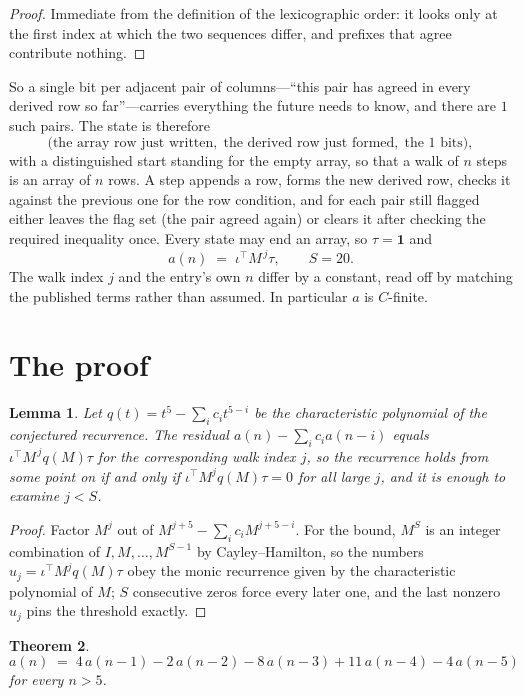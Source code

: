 \documentclass[11pt,a4paper]{article}
\theoremstyle{plain}
\newtheorem{theorem}{Theorem}
\newtheorem{lemma}[theorem]{Lemma}
\theoremstyle{definition}
\begin{document}
\begin{proof}
Immediate from the definition of the lexicographic order: it looks only at the first index at
which the two sequences differ, and prefixes that agree contribute nothing.
\end{proof}

So a single bit per adjacent pair of columns---``this pair has agreed in every derived row so
far''---carries everything the future needs to know, and there are $1$ such pairs. The state
is therefore
\[
\bigl(\text{the array row just written},\; \text{the derived row just formed},\;
\text{the 1 bits}\bigr),
\]
with a distinguished start standing for the empty array, so that a walk of $n$ steps is an array
of $n$ rows. A step appends a row, forms the new derived row, checks it against the previous one
for the row condition, and for each pair still flagged either leaves the flag set (the pair
agreed again) or clears it after checking the required inequality once. Every state may end an
array, so $\tau=\mathbf{1}$ and
\[
a(n)\;=\;\iota^{\!\top}M^{\,j}\tau ,\qquad S=20.
\]
The walk index $j$ and the entry's own $n$ differ by a constant, read off by matching the
published terms rather than assumed. In particular $a$ is $C$-finite.

\section{The proof}

\begin{lemma}\label{lem:crit}
Let $q(t)=t^{5}-\sum_i c_it^{5-i}$ be the characteristic polynomial of the
conjectured recurrence. The residual $a(n)-\sum_ic_ia(n-i)$ equals
$\iota^{\!\top}M^{\,j}q(M)\tau$ for the corresponding walk index $j$, so the recurrence
holds from some point on if and only if $\iota^{\!\top}M^{j}q(M)\tau=0$ for all large $j$,
and it is enough to examine $j<S$.
\end{lemma}

\begin{proof}
Factor $M^{j}$ out of $M^{j+5}-\sum_ic_iM^{j+5-i}$. For the bound, $M^{S}$
is an integer combination of $I,M,\dots,M^{S-1}$ by Cayley--Hamilton, so the numbers
$u_j=\iota^{\!\top}M^{j}q(M)\tau$ obey the monic recurrence given by the characteristic
polynomial of $M$; $S$ consecutive zeros force every later one, and the last nonzero $u_j$
pins the threshold exactly.
\end{proof}

\begin{theorem}
\[
a(n)\;=\;4\,a(n-1) - 2\,a(n-2) - 8\,a(n-3) + 11\,a(n-4) - 4\,a(n-5)
\]
for every $n>5$.
\end{theorem}
\end{document}
